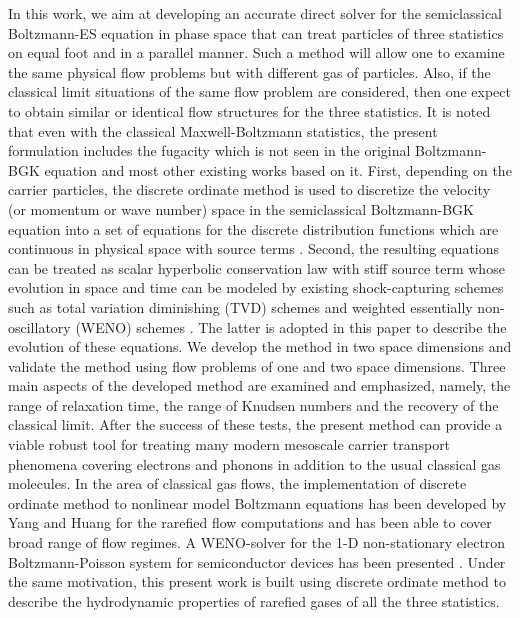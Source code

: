 \documentclass{rsproca}%
\begin{document}
In this work, we aim at developing an accurate direct solver for the semiclassical Boltzmann-ES equation in phase space that can treat particles of three statistics on equal foot and in a parallel manner.   Such a method will allow one to examine the same physical flow problems but with different gas of particles.   Also, if the classical limit situations of the same flow problem are considered, then one expect to obtain similar or identical flow structures for the three statistics.   It is noted that even with the classical Maxwell-Boltzmann statistics, the present formulation includes the fugacity which is not seen in the original Boltzmann-BGK equation \cite{PhysRev.94.511} and most other existing works based on it.   First, depending on the carrier particles, the discrete ordinate method is used to discretize the velocity (or momentum or wave number) space in the semiclassical Boltzmann-BGK equation into a set of equations for the discrete distribution functions which are continuous in physical space with source terms \cite{Yang1995323}.  Second, the resulting equations can be treated as scalar hyperbolic conservation law with stiff source term whose evolution in space and time can be modeled by existing shock-capturing schemes such as total variation diminishing (TVD) schemes \cite{Harten1983357} and weighted essentially non-oscillatory (WENO) schemes \cite{Xu2005458}.  The latter is adopted in this paper to describe the evolution of these equations.   We develop the method in two space dimensions and validate the method using flow problems of one and two space dimensions.  Three main aspects of the developed method are examined and emphasized, namely, the range of relaxation time, the range of Knudsen numbers and the recovery of the classical limit.  After the success of these tests, the present method can provide a viable robust tool for treating many modern mesoscale carrier transport phenomena covering electrons and phonons in addition to the usual classical gas molecules.
In the area of classical gas flows, the implementation of discrete ordinate method to nonlinear model Boltzmann equations has been developed by Yang and Huang \cite{Yang1995323} for the rarefied flow computations and has been able to cover broad range of flow regimes.  A WENO-solver
for the 1-D non-stationary electron Boltzmann-Poisson system for semiconductor devices has been presented \cite{Carrillo2003498}. Under the same motivation, this present work is built using discrete ordinate method to describe the hydrodynamic properties of rarefied gases of all the three statistics.
\end{document}
